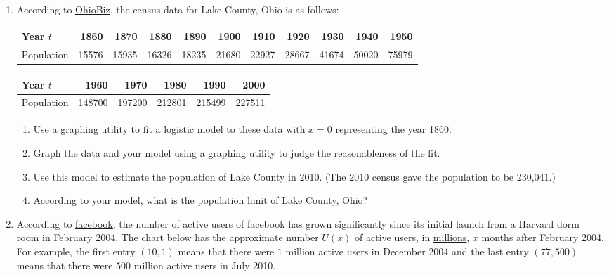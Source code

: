 \begin{enumerate}
\begin{enumerate}
\end{enumerate}

\item  According to \href{http://www.ohiobiz.com/census/Lake.pdf}{\underline{OhioBiz}}, the census data for Lake County, Ohio is as follows:

\small
\noindent \begin{tabular}{|l|r|r|r|r|r|r|r|r|r|r|} \hline
Year $t$ & 1860 & 1870 & 1880 & 1890 & 1900 & 1910 & 1920 & 1930 & 1940 & 1950 \\ \hline 
Population& 15576 & 15935 & 16326 & 18235 & 21680 & 22927 & 28667 & 41674 & 50020 & 75979 \\ \hline
\end{tabular}

\noindent \begin{tabular}{|l|r|r|r|r|r|} \hline
Year $t$ & 1960 & 1970 & 1980 & 1990 & 2000 \\ \hline 
Population& 148700 & 197200 & 212801 & 215499 & 227511 \\ \hline
\end{tabular}

\normalsize

\begin{enumerate}

\item  Use a graphing utility to fit a logistic model to these data with $x = 0$ representing the year 1860. 

\item  Graph the data and your model using a graphing utility to judge the reasonableness of the fit.

\item  Use this model to estimate the population of Lake County in 2010.  (The 2010 census gave the population to be 230,041.)

\item  According to your model, what is the population limit of Lake County, Ohio?

\end{enumerate}


\item According to \href{http://www.facebook.com/press/info.php?timeline}{\underline{facebook}}, the number of active users of facebook has grown significantly since its initial launch from a Harvard dorm room in February 2004. The chart below has the approximate number $U(x)$ of active users, in \underline{millions}, $x$ months after February 2004.  For example, the first entry $(10, 1)$ means that there were $1$ million active users in December 2004 and the last entry $(77, 500)$ means that there were $500$ million active users in July 2010.


\end{enumerate}
